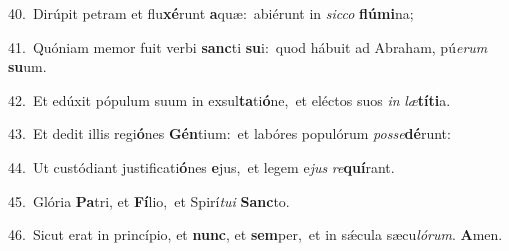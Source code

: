 {\numbfont\textcolor{\numbcolor}{40.}}~Dirúpit petram et flu\-\textbf{xé}\-runt \textbf{a}\-quæ:~\star abiérunt in \textit{sic}\-\textit{co} \textbf{flú}\-\textbf{mi}na;\par
{\numbfont\textcolor{\numbcolor}{41.}}~Quóniam memor fuit verbi \textbf{sanc}\-ti \textbf{su}\-i:~\star quod hábuit ad Abraham, pú\-\textit{e}\-\textit{rum} \textbf{su}\-um.\par
{\numbfont\textcolor{\numbcolor}{42.}}~Et edúxit pópulum suum in exsul\-\textbf{ta}\-ti\-\textbf{ó}\-ne,~\star et eléctos suos \textit{in} \textit{læ}\-\textbf{tí}\textbf{ti}a.\par
{\numbfont\textcolor{\numbcolor}{43.}}~Et dedit illis regi\-\textbf{ó}\-nes \textbf{Gén}\-tium:~\star et labóres populórum \textit{pos}\-\textit{se}\textbf{dé}runt:\par
{\numbfont\textcolor{\numbcolor}{44.}}~Ut custódiant justificati\-\textbf{ó}\-nes \textbf{e}\-jus,~\star et legem e\textit{jus} \textit{re}\-\textbf{quí}rant.\par
{\numbfont\textcolor{\numbcolor}{45.}}~Glória \textbf{Pa}\-tri, et \textbf{Fí}\-lio,~\star et Spirí\-\textit{tu}\-\textit{i} \textbf{Sanc}\-to.\par
{\numbfont\textcolor{\numbcolor}{46.}}~Sicut erat in princípio, et \textbf{nunc}\-, et \textbf{sem}\-per,~\star et in sǽcula sæcu\-\textit{ló}\-\textit{rum}. \textbf{A}\-men.\par
